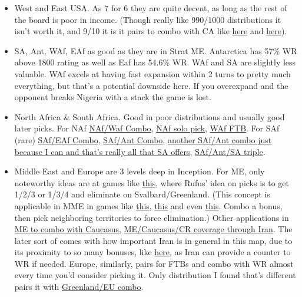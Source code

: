 \begin{itemize}
\begin{itemize}
    \end{itemize}
    \item West and East USA. As 7 for 6 they are quite decent, as long as the rest of the board is poor in income. (Though really like 990/1000 distributions it isn't worth it, and 9/10 it is it pairs to combo with CA like \href{https://www.warzone.com/MultiPlayer?GameID=30401282}{here} and \href{https://www.warzone.com/MultiPlayer?GameID=24344386}{here}).
    \item SA, Ant, WAf, EAf as good as they are in Strat ME. Antarctica has 57\% WR above 1800 rating as well as Eaf has 54.6\% WR. WAf and SA are slightly less valuable. WAf excels at having fast expansion within 2 turns to pretty much everything, but that's a potential downside here. If you overexpand and the opponent breaks Nigeria with a stack the game is lost.
    \item North Africa \& South Africa. Good in poor distributions and usually good later picks. For NAf \href{https://www.warzone.com/MultiPlayer?GameID=38078527}{NAf/Waf Combo}, \href{https://www.warzone.com/MultiPlayer?GameID=38399011}{NAf solo pick}, \href{https://www.warzone.com/MultiPlayer?GameID=33487996}{WAf FTB}. For SAf (rare) \href{https://www.warzone.com/MultiPlayer?GameID=32980493}{SAf/EAf Combo}, \href{https://www.warzone.com/MultiPlayer?GameID=30213538}{SAf/Ant Combo}, \href{https://www.warzone.com/MultiPlayer?GameID=26789968}{another SAf/Ant combo just because I can and that's really all that SA offers}, \href{https://www.warzone.com/MultiPlayer?GameID=28772609}{SAf/Ant/SA triple}.
    \item Middle East and Europe are 3 levels deep in Inception. For ME, only noteworthy ideas are at games like \href{https://www.warzone.com/MultiPlayer?GameID=22483437}{this}, where Rufus' idea on picks is to get 1/2/3 or 1/3/4 and eliminate on Svalbard/Greenland. (This concept is applicable in MME in games like \href{https://www.warzone.com/MultiPlayer?GameID=40135438}{this}, \href{https://www.warzone.com/MultiPlayer?GameID=35830458}{this} and even \href{https://www.warzone.com/MultiPlayer?GameID=40326611}{this}. Combo a bonus, then pick neighboring territories to force elimination.) Other applications in \href{https://www.warzone.com/MultiPlayer?GameID=24164262}{ME to combo with Caucasus}, \href{https://www.warzone.com/MultiPlayer?GameID=22563562}{ME/Caucasus/CR coverage through Iran}. The later sort of comes with how important Iran is in general in this map, due to its proximity to so many bonuses, like \href{https://www.warzone.com/MultiPlayer?GameID=25691500}{here}, as Iran can provide a counter to WR if needed. Europe, similarly, pairs for FTBs and combo with WR almost every time you'd consider picking it. Only distribution I found that's different pairs it with  \href{https://www.warzone.com/MultiPlayer?GameID=26984683}{Greenland/EU combo}.

\end{itemize}
